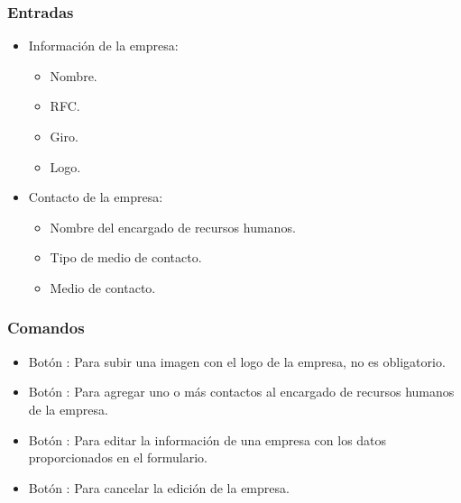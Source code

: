 \subsubsection{Entradas}
	\begin{itemize}
		\item Información de la empresa:
		\begin{itemize}
			\item Nombre.
			\item RFC.
			\item Giro.
			\item Logo.
		\end{itemize}
		\item Contacto de la empresa:
		\begin{itemize}
			\item Nombre del encargado de recursos humanos.
			\item Tipo de medio de contacto. 
			\item Medio de contacto. 
		\end{itemize}

	\end{itemize}

\subsubsection{Comandos}
 	\begin{itemize}
 	\item Botón : Para subir una imagen con el logo de la empresa, no es obligatorio.  
		\item Botón \IUbutton{+}: Para agregar uno o más contactos al encargado de recursos humanos de la empresa.
		\item Botón : Para editar la información de una empresa con los datos proporcionados en el formulario.
		\item Botón : Para cancelar la edición de la empresa.

	\end{itemize}
	
